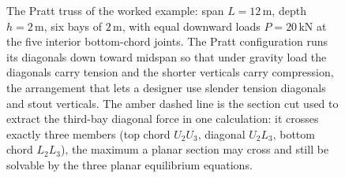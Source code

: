 \begin{figure}[htbp]
\begin{tikzpicture}[>=latex, x=1.0cm, y=1.0cm]
\end{tikzpicture}
\caption[Six-bay Pratt truss of the worked example]{The Pratt truss of
the worked example: span $L=12\,\si{\meter}$, depth $h=2\,\si{\meter}$,
six bays of $2\,\si{\meter}$, with equal downward loads $P=20\,\text{kN}$
at the five interior bottom-chord joints. The Pratt configuration runs
its diagonals down toward midspan so that under gravity load the
diagonals carry tension and the shorter verticals carry compression, the
arrangement that lets a designer use slender tension diagonals and stout
verticals. The amber dashed line is the section cut used to extract the
third-bay diagonal force in one calculation: it crosses exactly three
members (top chord $U_2U_3$, diagonal $U_2L_3$, bottom chord $L_2L_3$),
the maximum a planar section may cross and still be solvable by the three
planar equilibrium equations.}
\label{fig:vol03ch02:pratt-truss}
\end{figure}
